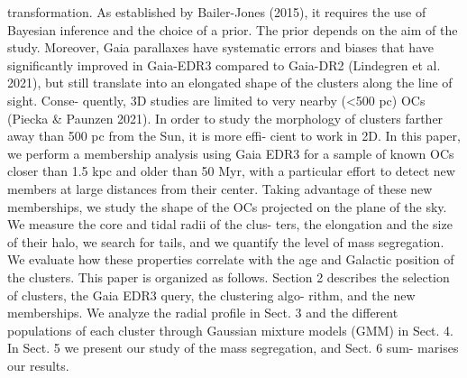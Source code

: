 \documentclass[../Main.tex]{subfiles}
\begin{document}
transformation. As established by Bailer-Jones (2015), it requires the use of Bayesian inference and the choice of a prior. The prior depends on the aim of the study. Moreover, Gaia parallaxes have systematic errors and biases that have significantly improved in Gaia-EDR3 compared to Gaia-DR2 (Lindegren et al. 2021), but still translate into an elongated shape of the clusters along the line of sight. Conse- quently, 3D studies are limited to very nearby (<500 pc) OCs (Piecka & Paunzen 2021). In order to study the morphology of clusters farther away than 500 pc from the Sun, it is more effi- cient to work in 2D.
In this paper, we perform a membership analysis using Gaia EDR3 for a sample of known OCs closer than 1.5 kpc and older than 50 Myr, with a particular effort to detect new members at large distances from their center. Taking advantage of these new memberships, we study the shape of the OCs projected on the plane of the sky. We measure the core and tidal radii of the clus- ters, the elongation and the size of their halo, we search for tails, and we quantify the level of mass segregation. We evaluate how these properties correlate with the age and Galactic position of the clusters.
This paper is organized as follows. Section 2 describes the selection of clusters, the Gaia EDR3 query, the clustering algo- rithm, and the new memberships. We analyze the radial profile in Sect. 3 and the different populations of each cluster through Gaussian mixture models (GMM) in Sect. 4. In Sect. 5 we present our study of the mass segregation, and Sect. 6 sum- marises our results.
\end{document}
